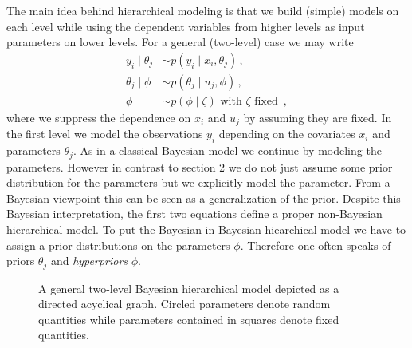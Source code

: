 The main idea behind hierarchical modeling is that we build (simple) models on each level while using the dependent variables from higher levels as input parameters on lower levels.
For a general (two-level) case we may write
\begin{align}
  y_i \mid \theta_j &\sim p(y_i \mid x_i, \theta_j) \,,\\
  \theta_j \mid \phi &\sim p(\theta_j \mid u_j, \phi) \,,\\
  \phi &\sim p(\phi \mid \zeta) \text{ with } \zeta \text{ fixed } \,,
\end{align}
where we suppress the dependence on $x_i$ and $u_j$ by assuming they are fixed.
In the first level we model the observations $y_i$ depending on the covariates $x_i$ and parameters $\theta_j$.
As in a classical Bayesian model we continue by modeling the parameters.
However in contrast to section 2 we do not just assume some prior distribution for the parameters but we explicitly model the parameter.
From a Bayesian viewpoint this can be seen as a generalization of the prior.
Despite this Bayesian interpretation, the first two equations define a proper non-Bayesian hierarchical model.
To put the Bayesian in Bayesian hiearchical model we have to assign a prior distributions on the parameters $\phi$.
Therefore one often speaks of priors $\theta_j$ and \emph{hyperpriors} $\phi$.

\begin{figure}[!ht]
\begin{center}
\end{center}
\label{tik:general_sem}
\caption{A general two-level Bayesian hierarchical model depicted as a directed acyclical graph. Circled parameters denote random quantities while parameters contained in squares denote fixed quantities.}
\end{figure}





